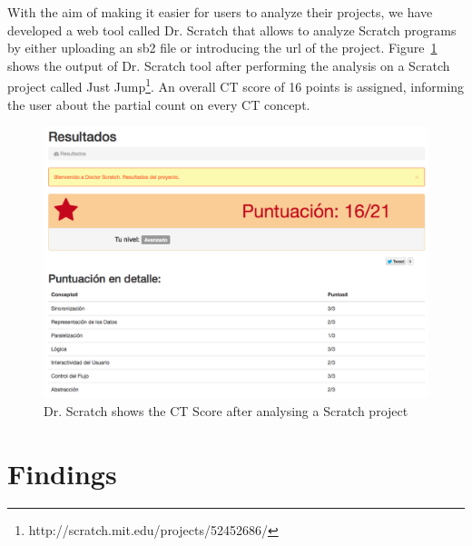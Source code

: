 \documentclass[a4paper,11pt]{article}
\begin{document}
With the aim of making it easier for users to analyze their projects, we have developed a web tool called Dr. Scratch that allows to analyze Scratch programs by either uploading an sb2 file or introducing the url of the project. Figure~\ref{fig:drscratch} shows the output of Dr. Scratch tool after performing the analysis on a Scratch project called Just Jump\footnote{http://scratch.mit.edu/projects/52452686/}. An overall CT score of 16 points is assigned, informing the user about the partial count on every CT concept.
\begin{figure}
  \centering
    \includegraphics[width=13cm]{img/results.png}
    \caption{Dr. Scratch shows the CT Score after analysing a Scratch project}
    \label{fig:drscratch}
\end{figure}

\section{Findings}
\label{sec:findings}
\end{document}
